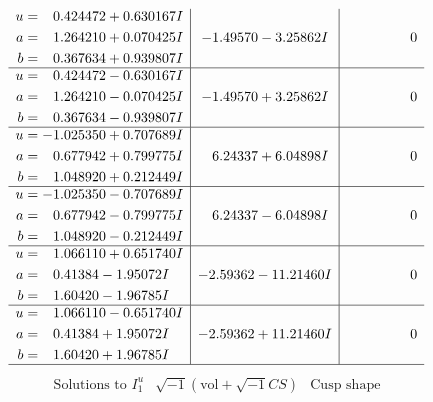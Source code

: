 \documentclass[1p]{elsarticle_modified}
\theoremstyle{definition}
\newcommand{\I}{\sqrt{-1}}
\begin{document}
$$\begin{array}{c|c|c}
\begin{aligned}
u &= \phantom{-}0.424472 + 0.630167 I \\
a &= \phantom{-}1.264210 + 0.070425 I \\
b &= \phantom{-}0.367634 + 0.939807 I\end{aligned}
 & -1.49570 - 3.25862 I & \phantom{-0.000000 } 0 \\ \hline\begin{aligned}
u &= \phantom{-}0.424472 - 0.630167 I \\
a &= \phantom{-}1.264210 - 0.070425 I \\
b &= \phantom{-}0.367634 - 0.939807 I\end{aligned}
 & -1.49570 + 3.25862 I & \phantom{-0.000000 } 0 \\ \hline\begin{aligned}
u &= -1.025350 + 0.707689 I \\
a &= \phantom{-}0.677942 + 0.799775 I \\
b &= \phantom{-}1.048920 + 0.212449 I\end{aligned}
 & \phantom{-}6.24337 + 6.04898 I & \phantom{-0.000000 } 0 \\ \hline\begin{aligned}
u &= -1.025350 - 0.707689 I \\
a &= \phantom{-}0.677942 - 0.799775 I \\
b &= \phantom{-}1.048920 - 0.212449 I\end{aligned}
 & \phantom{-}6.24337 - 6.04898 I & \phantom{-0.000000 } 0 \\ \hline\begin{aligned}
u &= \phantom{-}1.066110 + 0.651740 I \\
a &= \phantom{-}0.41384 - 1.95072 I \\
b &= \phantom{-}1.60420 - 1.96785 I\end{aligned}
 & -2.59362 - 11.21460 I & \phantom{-0.000000 } 0 \\ \hline\begin{aligned}
u &= \phantom{-}1.066110 - 0.651740 I \\
a &= \phantom{-}0.41384 + 1.95072 I \\
b &= \phantom{-}1.60420 + 1.96785 I\end{aligned}
 & -2.59362 + 11.21460 I & \phantom{-0.000000 } 0\\
 \hline 
 \end{array}$$\newpage$$\begin{array}{c|c|c}  
\text{Solutions to }I^u_{1}& \I (\text{vol} + \sqrt{-1}CS) & \text{Cusp shape}\\

\end{array}$$
\end{document}
